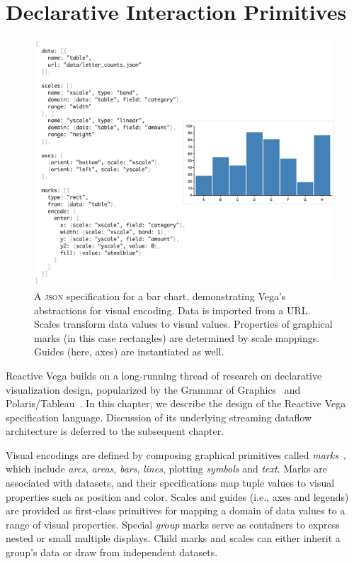 \graphicspath{{./vega-lang/figures/}}
\chapter{Declarative Interaction Primitives}
\label{sec:vg:lang}

\vspace{-30pt}

\begin{figure}[b!]
  \centering
  \includegraphics[width=0.85\columnwidth]{barChart}
  \caption{A \textsc{json} specification for a bar chart, demonstrating Vega's
  abstractions for visual encoding. Data is imported from a URL. Scales
  transform data values to visual values. Properties of graphical marks (in this
  case rectangles) are determined by scale mappings. Guides (here, axes) are
  instantiated as well.}
  \label{fig:vg:barChart}
\end{figure}

Reactive Vega builds on a long-running thread of research on declarative
visualization design, popularized by the Grammar of
Graphics~\cite{wilkinson:grammar} and Polaris/Tableau~\cite{stolte:polaris}. In
this chapter, we describe the design of the Reactive Vega specification
language. Discussion of its underlying streaming dataflow architecture is
deferred to the subsequent chapter.

Visual encodings are defined by composing graphical primitives called
\emph{marks}~\cite{bostock:protovis}, which include \emph{arcs}, \emph{areas},
\emph{bars}, \emph{lines}, plotting \emph{symbols} and \emph{text}. Marks are
associated with datasets, and their specifications map tuple values to visual
properties such as position and color. Scales and guides (i.e., axes and
legends) are provided as first-class primitives for mapping a domain of data
values to a range of visual properties. Special \emph{group} marks serve as
containers to express nested or small multiple displays. Child marks and scales
can either inherit a group's data or draw from independent datasets.

